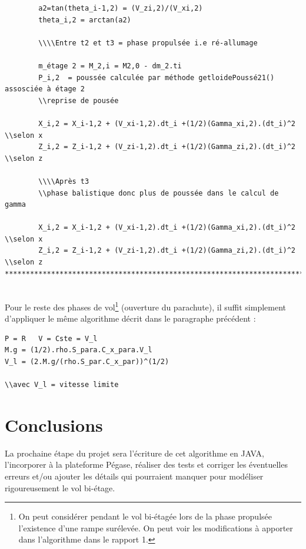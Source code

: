 \documentclass[a4paper]{article}
\begin{document}
\begin{verbatim}
		a2=tan(theta_i-1,2) = (V_zi,2)/(V_xi,2)
		theta_i,2 = arctan(a2)

		\\\\Entre t2 et t3 = phase propulsée i.e ré-allumage
		
		m_étage 2 = M_2,i = M2,0 - dm_2.ti
		P_i,2  = poussée calculée par méthode getloidePoussé21() assosciée à étage 2
		\\reprise de pousée
		
		X_i,2 = X_i-1,2 + (V_xi-1,2).dt_i +(1/2)(Gamma_xi,2).(dt_i)^2	\\selon x
		Z_i,2 = Z_i-1,2 + (V_zi-1,2).dt_i +(1/2)(Gamma_zi,2).(dt_i)^2	\\selon z
		
		\\\\Après t3
		\\phase balistique donc plus de poussée dans le calcul de gamma
		
		X_i,2 = X_i-1,2 + (V_xi-1,2).dt_i +(1/2)(Gamma_xi,2).(dt_i)^2	\\selon x
		Z_i,2 = Z_i-1,2 + (V_zi-1,2).dt_i +(1/2)(Gamma_zi,2).(dt_i)^2	\\selon z
*************************************************************************


\end{verbatim}


Pour le reste des phases de vol\footnote{On peut considérer pendant le vol bi-étagée lors de la phase propulsée l'existence d'une rampe surélevée. On peut voir les modifications à apporter dans l'algorithme dans le rapport 1.} (ouverture du parachute), il suffit simplement d'appliquer le même algorithme décrit dans le paragraphe précédent : 

\begin{verbatim}
P = R   V = Cste = V_l 
M.g = (1/2).rho.S_para.C_x_para.V_l
V_l = (2.M.g/(rho.S_par.C_x_par))^(1/2)

\\avec V_l = vitesse limite

\end{verbatim}





\section{Conclusions}

La prochaine étape du projet sera l'écriture de cet algorithme en JAVA, l'incorporer à la plateforme Pégase, réaliser des tests et corriger les éventuelles erreurs et/ou ajouter les détails qui pourraient manquer pour modéliser rigoureusement le vol bi-étage.

%
%
\end{document}
